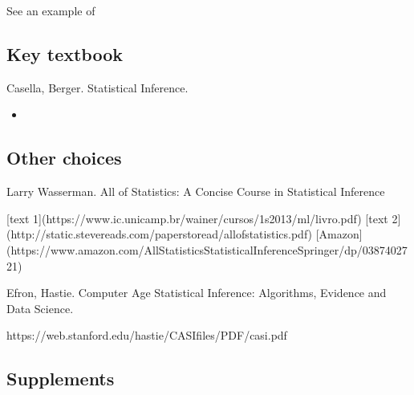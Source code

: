 \documentclass[letterpaper,10pt,english]{sphinxmanual}
\begin{document}
See an example of 




\subsection{Key textbook}
\label{\detokenize{textbook/statistics:key-textbook}}
Casella, Berger. Statistical Inference.
\begin{itemize}
\item {} 

\end{itemize}


\subsection{Other choices}
\label{\detokenize{textbook/statistics:other-choices}}
Larry Wasserman. All of Statistics: A Concise Course in Statistical Inference

\begin{sphinxVerbatim}[commandchars=\\\{\}]
\PYGZhy{} [text 1](https://www.ic.unicamp.br/\PYGZti{}wainer/cursos/1s2013/ml/livro.pdf)
\PYGZhy{} [text 2](http://static.stevereads.com/papers\PYGZus{}to\PYGZus{}read/all\PYGZus{}of\PYGZus{}statistics.pdf)
\PYGZhy{} [Amazon](https://www.amazon.com/All\PYGZhy{}Statistics\PYGZhy{}Statistical\PYGZhy{}Inference\PYGZhy{}Springer/dp/0387402721)
\end{sphinxVerbatim}

Efron, Hastie. Computer Age Statistical Inference: Algorithms, Evidence and Data Science.

\begin{sphinxVerbatim}[commandchars=\\\{\}]
\PYGZhy{} https://web.stanford.edu/\PYGZti{}hastie/CASI\PYGZus{}files/PDF/casi.pdf
\end{sphinxVerbatim}


\subsection{Supplements}
\label{\detokenize{textbook/statistics:supplements}}
\end{document}
